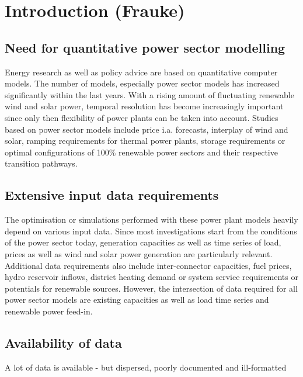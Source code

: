 \documentclass[article]{elsarticle}
\begin{document}
\section{Introduction (Frauke)}
\label{Introduction}

\subsection{Need for quantitative power sector modelling}
Energy research as well as policy advice are based on quantitative computer models. The number of models, especially power sector models has increased significantly within the last years. With a rising amount of fluctuating renewable wind and solar power, temporal resolution has become increasingly important since only then flexibility of power plants can be taken into account. Studies based on power sector models include price i.a. forecasts, interplay of wind and solar, ramping requirements for thermal power plants, storage requirements or optimal configurations of 100\% renewable power sectors and their respective transition pathways.

\subsection{Extensive input data requirements}
The optimisation or simulations performed with these power plant models heavily depend on various input data. Since most investigations start from the conditions of the power sector today, generation capacities as well as time series of load, prices as well as wind and solar power generation are particularly relevant. Additional data requirements also include inter-connector capacities, fuel prices, hydro reservoir inflows, district heating demand or system service requirements or potentials for renewable sources. However, the intersection of data required for all power sector models are existing capacities as well as load time series and renewable power feed-in.

\subsection{Availability of data}
A lot of data is available - but dispersed, poorly documented and ill-formatted
\end{document}
